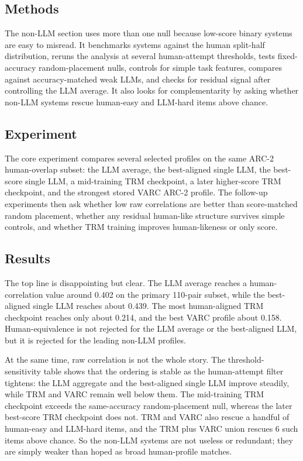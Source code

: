 \documentclass[11pt,letterpaper]{article}
\begin{document}
\subsection{Methods}

The non-LLM section uses more than one null because low-score binary systems are easy to misread. It benchmarks systems against the human split-half distribution, reruns the analysis at several human-attempt thresholds, tests fixed-accuracy random-placement nulls, controls for simple task features, compares against accuracy-matched weak LLMs, and checks for residual signal after controlling the LLM average. It also looks for complementarity by asking whether non-LLM systems rescue human-easy and LLM-hard items above chance.

\subsection{Experiment}

The core experiment compares several selected profiles on the same ARC-2 human-overlap subset: the LLM average, the best-aligned single LLM, the best-score single LLM, a mid-training TRM checkpoint, a later higher-score TRM checkpoint, and the strongest stored VARC ARC-2 profile. The follow-up experiments then ask whether low raw correlations are better than score-matched random placement, whether any residual human-like structure survives simple controls, and whether TRM training improves human-likeness or only score.

\subsection{Results}

The top line is disappointing but clear. The LLM average reaches a human-correlation value around 0.402 on the primary 110-pair subset, while the best-aligned single LLM reaches about 0.439. The most human-aligned TRM checkpoint reaches only about 0.214, and the best VARC profile about 0.158. Human-equivalence is not rejected for the LLM average or the best-aligned LLM, but it is rejected for the leading non-LLM profiles.

At the same time, raw correlation is not the whole story. The threshold-sensitivity table shows that the ordering is stable as the human-attempt filter tightens: the LLM aggregate and the best-aligned single LLM improve steadily, while TRM and VARC remain well below them. The mid-training TRM checkpoint exceeds the same-accuracy random-placement null, whereas the later best-score TRM checkpoint does not. TRM and VARC also rescue a handful of human-easy and LLM-hard items, and the TRM plus VARC union rescues 6 such items above chance. So the non-LLM systems are not useless or redundant; they are simply weaker than hoped as broad human-profile matches.
\end{document}
